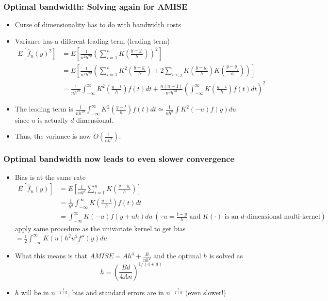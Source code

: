 \documentclass[aspectratio=169]{beamer}
\begin{document}
\begin{frame}
\frametitle{Optimal bandwidth: Solving again for AMISE }
\begin{itemize}
\item Curse of dimensionality has to do with bandwidth costs
\item Variance has a different leading term (leading term)
 \footnotesize{\begin{align*}
 E[\hat{f}_n(y)^2]&=E\left[\frac{1}{n^2h^{2d}}\left(\sum_{i=1}^nK\left(\frac{y-y_i}{h}\right)\right)^2\right]\\
 &=E\left[\frac{1}{n^2h^{2d}}\left(\sum_{i=1}^nK^2\left(\frac{y-y_i}{h}\right)+2\sum_{i<j} K\left(\frac{y-y_i}{h}\right)K\left(\frac{y-y_j}{h}\right)\right)\right]\\
 &=\frac{1}{nh^{2d}}\int_{-\infty}^\infty K^2\left(\frac{y-t}{h}\right)f(t)dt+\frac{n(n-1)}{n^2h^{2d}}\left(\int_{-\infty}^\infty K\left(\frac{y-t}{h}\right)f(t)dt\right)^2
 \end{align*}}\normalsize
\item The leading term is $\frac{1}{nh^{2d}}\int_{-\infty}^\infty K^2\left(\frac{y-t}{h}\right)f(t)dt \simeq \frac{1}{nh^d}\int K^2(-u)f(y)du$ since $u$ is actually $d$-dimensional. 
\item Thus, the variance is now $O\left(\frac{1}{nh^d}\right)$. 
\end{itemize}
\end{frame}

\begin{frame}
\frametitle{Optimal bandwidth now leads to even slower convergence}
\begin{itemize}
\item Bias is at the same rate
\footnotesize{ \begin{align*}
  E[\hat{f}_n(y)]&=E\left[ \frac{1}{nh^d}\sum_{i=1}^nK\left(\frac{y-y_i}{h}\right) \right]\\
  &=\frac{1}{h^d}\int_{-\infty}^\infty K\left(\frac{y-t}{h}\right)f(t)dt\\
    &=\int_{-\infty}^\infty K(-u)f(y+uh)du \ (\because\text{$u=\frac{t-y}{h}$ and $K(\cdot)$ is an $d$-dimensional multi-kernel})
 \end{align*}}\normalsize
 apply same procedure as the univariate kernel to get bias$= \frac{1}{2}\int_{-\infty}^\infty K(u)h^2u^2f''(y)du$
\item   What this means is that $AMISE=Ah^4+\frac{B}{nh^d}$ and the optimal $h$ is solved as
 \[
 h=\left(\frac{Bd}{4An}\right)^{1/(4+d)}
 \]
 \item  $h$ will be in $n^{-\frac{1}{4+d}}$, bias and standard errors are in $n^{-\frac{2}{4+d}}$ (even slower!)
\end{itemize}
\end{frame}
\end{document}
